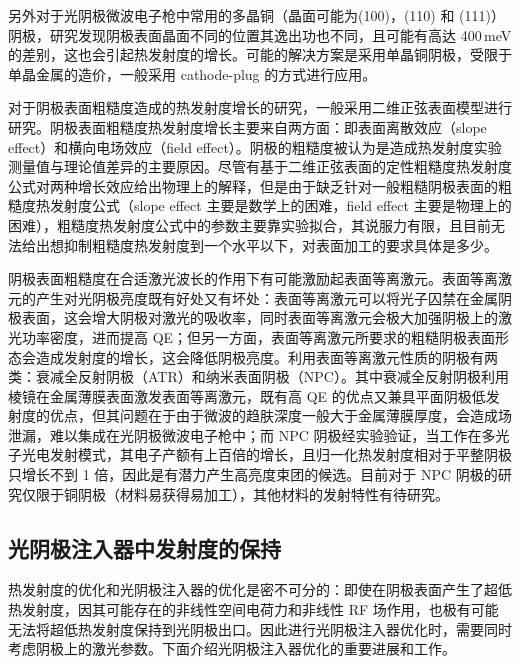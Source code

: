 另外对于光阴极微波电子枪中常用的多晶铜（晶面可能为(100)，(110) 和 (111)）阴极，研究发现阴极表面晶面不同的位置其逸出功也不同，且可能有高达 400\,meV 的差别\cite{Renault:2006aa}，这也会引起热发射度的增长。可能的解决方案是采用单晶铜阴极，受限于单晶金属的造价，一般采用 cathode-plug 的方式进行应用\cite{Ganter:2013aa}。

对于阴极表面粗糙度造成的热发射度增长的研究，一般采用二维正弦表面模型进行研究\cite{He:2004aa,Krasilnikov:2006aa,Karkare:2011aa}。阴极表面粗糙度热发射度增长主要来自两方面：即表面离散效应（slope effect）和横向电场效应（field effect）\cite{Bradley:1977aa}。阴极的粗糙度被认为是造成热发射度实验测量值与理论值差异的主要原因\cite{qian2012experimental,Vecchione:2012aa,schubert2013bi}。尽管有基于二维正弦表面的定性粗糙度热发射度公式对两种增长效应给出物理上的解释，但是由于缺乏针对一般粗糙阴极表面的粗糙度热发射度公式（slope effect 主要是数学上的困难，field effect 主要是物理上的困难），粗糙度热发射度公式中的参数主要靠实验拟合，其说服力有限，且目前无法给出想抑制粗糙度热发射度到一个水平以下，对表面加工的要求具体是多少。

阴极表面粗糙度在合适激光波长的作用下有可能激励起表面等离激元\cite{Novotny:2012aa}。表面等离激元的产生对光阴极亮度既有好处又有坏处：表面等离激元可以将光子囚禁在金属阴极表面，这会增大阴极对激光的吸收率，同时表面等离激元会极大加强阴极上的激光功率密度，进而提高 QE；但另一方面，表面等离激元所要求的粗糙阴极表面形态会造成发射度的增长，这会降低阴极亮度。利用表面等离激元性质的阴极有两类：衰减全反射阴极（ATR）和纳米表面阴极（NPC）。其中衰减全反射阴极利用棱镜在金属薄膜表面激发表面等离激元，既有高 QE 的优点又兼具平面阴极低发射度的优点，但其问题在于由于微波的趋肤深度一般大于金属薄膜厚度，会造成场泄漏，难以集成在光阴极微波电子枪中\cite{Watanabe:2011aa,Neo:2012aa}；而 NPC 阴极经实验验证，当工作在多光子光电发射模式\cite{Musumeci:2010aa}，其电子产额有上百倍的增长，且归一化热发射度相对于平整阴极只增长不到 1 倍\cite{Polyakov:2013ab,Li:2013ac}，因此是有潜力产生高亮度束团的候选。目前对于 NPC 阴极的研究仅限于铜阴极（材料易获得易加工），其他材料的发射特性有待研究。

\subsection{光阴极注入器中发射度的保持}
热发射度的优化和光阴极注入器的优化是密不可分的：即使在阴极表面产生了超低热发射度，因其可能存在的非线性空间电荷力和非线性 RF 场作用，也极有可能无法将超低热发射度保持到光阴极出口。因此进行光阴极注入器优化时，需要同时考虑阴极上的激光参数。下面介绍光阴极注入器优化的重要进展和工作。

